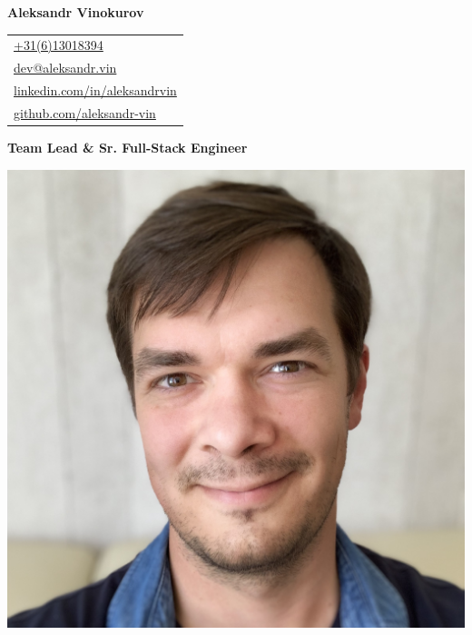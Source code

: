 \documentclass[letterpaper, 11pt]{article}
\begin{document}
\noindent
\begin{minipage}[t]{0.65\textwidth}

  \textbf{\Huge Aleksandr Vinokurov}

  \vspace{1.7em}

  \begin{tabular}{@{\hspace{1.5em}}l}
    \href{tel:+31613018394}{\url{+31(6)13018394}} \\
    \href{mailto:dev@aleksandr.vin}{\url{dev@aleksandr.vin}} \\
    \href{https://linkedin.com/in/aleksandrvin}{\url{linkedin.com/in/aleksandrvin}} \\
    \href{https://github.com/aleksandr-vin}{\url{github.com/aleksandr-vin}} \\
  \end{tabular}

  \vspace{1.6em}

  \noindent\parbox{\linewidth}{\raggedright\textbf{\Large Team Lead \& Sr. Full-Stack Engineer}}
\end{minipage}\hfill
\begin{minipage}[t]{0.27\textwidth}
  \vspace{-5ex} %
  \includegraphics[width=\linewidth]{me.jpg}
\end{minipage}
\end{document}
